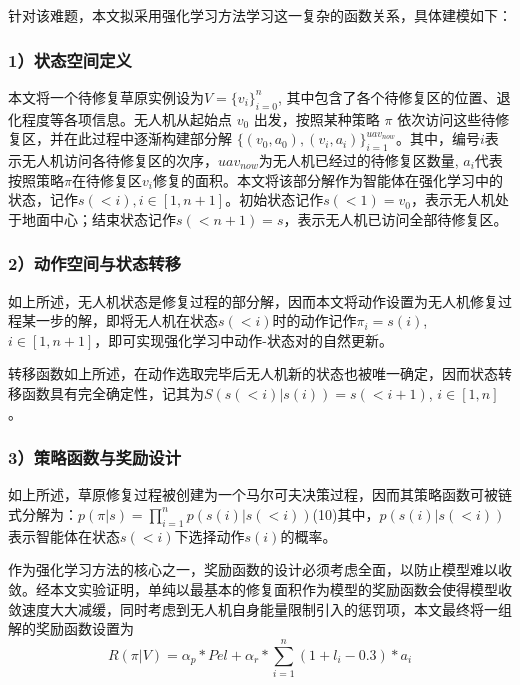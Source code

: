 \documentclass[AutoFakeBold]{LZUThesis}
\begin{document}
针对该难题，本文拟采用强化学习方法学习这一复杂的函数关系，具体建模如下：

\subsubsection{1）状态空间定义}

本文将一个待修复草原实例设为$V=\{v_i\}_{i=0}^n$, 其中包含了各个待修复区的位置、退化程度等各项信息。无人机从起始点 $v_0$ 出发，按照某种策略 $\pi$ 依次访问这些待修复区，并在此过程中逐渐构建部分解 $\{(v_0,a_0),(v_i,a_i)\}_{i=1}^{uav_{now}}$。其中，编号$i$表示无人机访问各待修复区的次序，$uav_{now}$为无人机已经过的待修复区数量, $a_i$代表按照策略$\pi$在待修复区$v_i$修复的面积。本文将该部分解作为智能体在强化学习中的状态，记作$s(<i),i\in[1,n+1]$。初始状态记作$s(<1)=v_0$，表示无人机处于地面中心；结束状态记作$s(<n+1)=s$，表示无人机已访问全部待修复区。

\subsubsection{2）动作空间与状态转移}

如上所述，无人机状态是修复过程的部分解，因而本文将动作设置为无人机修复过程某一步的解，即将无人机在状态$s(<i)$时的动作记作$\pi_i=s(i)$,$i\in[1,n+1]$，即可实现强化学习中动作-状态对的自然更新。

转移函数如上所述，在动作选取完毕后无人机新的状态也被唯一确定，因而状态转移函数具有完全确定性，记其为$S(s(<i)|s(i))=s(<i+1)$, $i\in[1,n]$。

\subsubsection{3）策略函数与奖励设计}

如上所述，草原修复过程被创建为一个马尔可夫决策过程，因而其策略函数可被链式分解为：$p(\pi|s)=\prod_{i=1}^n p(s(i)|s(<i))$(10)其中，$p(s(i)|s(<i))$表示智能体在状态$s(<i)$下选择动作$s(i)$的概率。

作为强化学习方法的核心之一，奖励函数的设计必须考虑全面，以防止模型难以收敛。经本文实验证明，单纯以最基本的修复面积作为模型的奖励函数会使得模型收敛速度大大减缓，同时考虑到无人机自身能量限制引入的惩罚项，本文最终将一组解的奖励函数设置为
\begin{equation}
	R(\pi|V)=\alpha_{p}*Pel+\alpha_{r}*\sum_{i=1}^{n}(1+ l_i - 0.3)*a_{i}
	\label{eq:11}
\end{equation}
\end{document}

